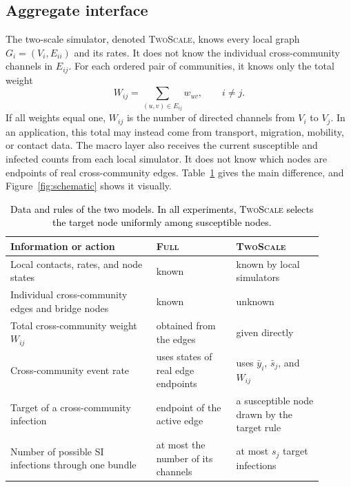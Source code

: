 \documentclass[a4paper,fleqn]{cas-sc}
\newcommand{\ibar}{\bar{y}}
\newcommand{\sbar}{\bar{s}}
\newcommand{\Full}{\textup{\textsc{Full}}}
\newcommand{\TS}{\textup{\textsc{TwoScale}}}
\begin{document}
\subsection{Aggregate interface}
\label{sec:interface}

The two-scale simulator, denoted \TS{}, knows every local graph $G_i=(V_i,E_{ii})$ and its rates. It does not know the individual cross-community channels in $E_{ij}$. For each ordered pair of communities, it knows only the total weight
\begin{equation}
\label{eq:weight}
W_{ij}=\sum_{(u,v)\in E_{ij}}w_{uv},
\qquad i\neq j.
\end{equation}
If all weights equal one, $W_{ij}$ is the number of directed channels from $V_i$ to $V_j$. In an application, this total may instead come from transport, migration, mobility, or contact data. The macro layer also receives the current susceptible and infected counts from each local simulator. It does not know which nodes are endpoints of real cross-community edges. Table~\ref{tab:information} gives the main difference, and Figure~\ref{fig:schematic} shows it visually.

\begin{table}[tbp]
\color{black}
\centering
\caption{\textcolor{black}{Data and rules of the two models. In all experiments, \TS{} selects the target node uniformly among susceptible nodes.}}
\label{tab:information}
\small
\begin{tabular}{>{\raggedright\arraybackslash}p{0.42\linewidth}>{\raggedright\arraybackslash}p{0.23\linewidth}>{\raggedright\arraybackslash}p{0.25\linewidth}}
\toprule
Information or action & \Full{} & \TS{}\\
\midrule
Local contacts, rates, and node states & known & known by local simulators\\
Individual cross-community edges and bridge nodes & known & unknown\\
Total cross-community weight $W_{ij}$ & obtained from the edges & given directly\\
Cross-community event rate & uses states of real edge endpoints & uses $\ibar_i$, $\sbar_j$, and $W_{ij}$\\
Target of a cross-community infection & endpoint of the active edge & a susceptible node drawn by the target rule\\
Number of possible SI infections through one bundle & at most the number of its channels & at most $s_j$ target infections\\
\bottomrule
\end{tabular}
\end{table}
\end{document}
